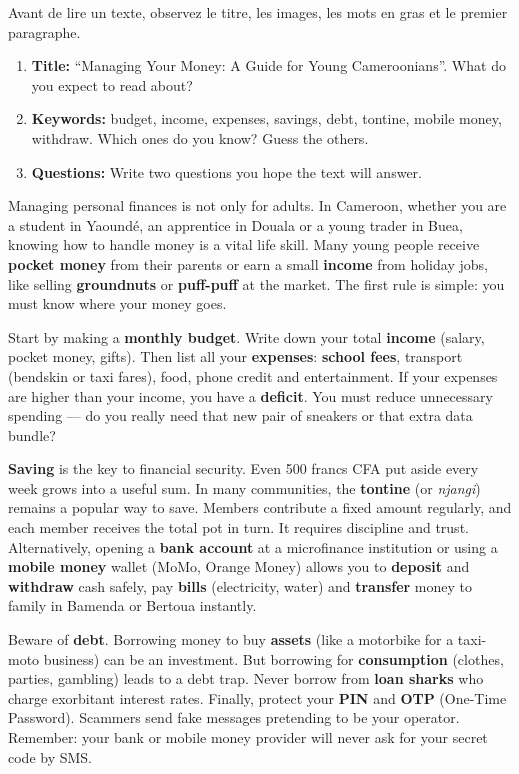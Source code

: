 \documentclass[11pt]{article}
\newcommand{\cle}[1]{{\popxbold\color{popdark}#1}}
\newcounter{popsec}
\newcounter{popsub}
\newcommand{\courssub}[1]{%
  \stepcounter{popsub}%
  \par\vspace{9pt}\noindent{\popxbold\fontsize{11.5}{13}\selectfont\color{popink}{\color{poporange}\thepopsec.\thepopsub}\hspace{6pt}#1}\par\nopagebreak\vspace{4pt}
}
\begin{document}
\begin{methode}
Avant de lire un texte, observez le titre, les images, les mots en gras et le premier paragraphe.
\begin{enumerate}
\item \textbf{Title:} “Managing Your Money: A Guide for Young Cameroonians”. What do you expect to read about?
\item \textbf{Keywords:} \cle{budget}, \cle{income}, \cle{expenses}, \cle{savings}, \cle{debt}, \cle{tontine}, \cle{mobile money}, \cle{withdraw}. Which ones do you know? Guess the others.
\item \textbf{Questions:} Write two questions you hope the text will answer.
\end{enumerate}
\end{methode}

\courssub{Reading Text with Glossary}

\begin{textebox}
Managing personal finances is not only for adults. In Cameroon, whether you are a student in Yaoundé, an apprentice in Douala or a young trader in Buea, knowing how to handle money is a vital life skill. Many young people receive \textbf{pocket money} from their parents or earn a small \textbf{income} from holiday jobs, like selling \textbf{groundnuts} or \textbf{puff-puff} at the market. The first rule is simple: you must know where your money goes.

Start by making a \textbf{monthly budget}. Write down your total \textbf{income} (salary, pocket money, gifts). Then list all your \textbf{expenses}: \textbf{school fees}, transport (bendskin or taxi fares), food, phone credit and entertainment. If your expenses are higher than your income, you have a \textbf{deficit}. You must reduce unnecessary spending — do you really need that new pair of sneakers or that extra data bundle?

\textbf{Saving} is the key to financial security. Even 500 francs CFA put aside every week grows into a useful sum. In many communities, the \textbf{tontine} (or \emph{njangi}) remains a popular way to save. Members contribute a fixed amount regularly, and each member receives the total pot in turn. It requires discipline and trust. Alternatively, opening a \textbf{bank account} at a microfinance institution or using a \textbf{mobile money} wallet (MoMo, Orange Money) allows you to \textbf{deposit} and \textbf{withdraw} cash safely, pay \textbf{bills} (electricity, water) and \textbf{transfer} money to family in Bamenda or Bertoua instantly.

Beware of \textbf{debt}. Borrowing money to buy \textbf{assets} (like a motorbike for a taxi-moto business) can be an investment. But borrowing for \textbf{consumption} (clothes, parties, gambling) leads to a debt trap. Never borrow from \textbf{loan sharks} who charge exorbitant interest rates. Finally, protect your \textbf{PIN} and \textbf{OTP} (One-Time Password). Scammers send fake messages pretending to be your operator. Remember: your bank or mobile money provider will never ask for your secret code by SMS.
\end{textebox}
\end{document}
